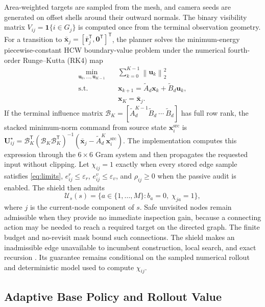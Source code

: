 \documentclass{IEEEtaes}
\newcommand{\norm}[1]{\left\lVert #1 \right\rVert}
\theoremstyle{remark}
\theoremstyle{plain}
\begin{document}
Area-weighted targets are sampled from the mesh, and camera seeds are generated on offset shells around their outward normals. The binary visibility matrix $V_{ij}=\mathbf 1\{i\in G_j\}$ is computed once from the terminal observation geometry. For a transition to $\bar{\mathbf x}_j=[\bar{\mathbf r}_j^{\mathsf T},\mathbf0^{\mathsf T}]^{\mathsf T}$, the planner solves the minimum-energy piecewise-constant HCW boundary-value problem under the numerical fourth-order Runge--Kutta (RK4) map
\begin{equation}
  \begin{aligned}
  \min_{\mathbf u_0,\ldots,\mathbf u_{K-1}}\quad&
  \sum_{k=0}^{K-1}\norm{\mathbf u_k}_2^2\\
  \mathrm{s.t.}\quad&
  \mathbf x_{k+1}=\widetilde A_d\mathbf x_k+\widetilde B_d\mathbf u_k,\\
  &\mathbf x_K=\bar{\mathbf x}_j.
  \end{aligned}
  \label{eq:terminal-transfer}
\end{equation}
If the terminal influence matrix $\mathcal B_K=[\widetilde A_d^{K-1}\widetilde B_d\ \cdots\ \widetilde B_d]$ has full row rank, the stacked minimum-norm command from source state $\mathbf x_i^{\mathrm{src}}$ is $\mathbf U_{ij}^\star=\mathcal B_K^{\mathsf T}(\mathcal B_K\mathcal B_K^{\mathsf T})^{-1}(\bar{\mathbf x}_j-\widetilde A_d^K\mathbf x_i^{\mathrm{src}})$. The implementation computes this expression through the $6\times6$ Gram system and then propagates the requested input without clipping. Let $\chi_{ij}=1$ exactly when every stored edge sample satisfies \eqref{eq:limits}, $e_{ij}^{r}\le\varepsilon_r$, $e_{ij}^{v}\le\varepsilon_v$, and $\rho_{ij}\ge0$ when the passive audit is enabled. The shield then admits
\begin{equation}
  \mathcal U_s(s)=\{a\in\{1,\ldots,M\}:b_a=0,\;\chi_{ja}=1\},
  \label{eq:safe-action-set}
\end{equation}
where $j$ is the current-node component of $s$. Safe unvisited nodes remain admissible when they provide no immediate inspection gain, because a connecting action may be needed to reach a required target on the directed graph. The finite budget and no-revisit mask bound such connections. The shield makes an inadmissible edge unavailable to incumbent construction, local search, and exact recursion \cite{alshiekh2018shielding}. Its guarantee remains conditional on the sampled numerical rollout and deterministic model used to compute $\chi_{ij}$.

\subsection{Adaptive Base Policy and Rollout Value}
\end{document}
